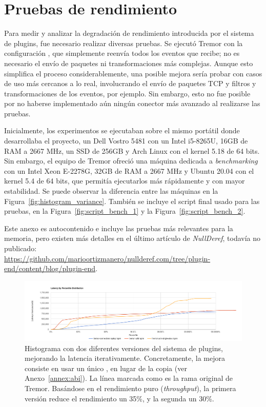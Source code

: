 \chapter{Pruebas de rendimiento}\label{annex:benchmarks}

Para medir y analizar la degradación de rendimiento introducida por el sistema
de plugins, fue necesario realizar diversas pruebas. Se ejecutó Tremor con la
configuración , que simplemente reenvía todos los eventos que
recibe; no es necesario el envío de paquetes ni transformaciones más complejas.
Aunque esto simplifica el proceso considerablemente, una posible mejora sería
probar con casos de uso más cercanos a lo real, involucrando el envío de
paquetes TCP y filtros y transformaciones de los eventos, por ejemplo. Sin
embargo, esto no fue posible por no haberse implementado aún ningún conector más
avanzado al realizarse las pruebas.

Inicialmente, los experimentos se ejecutaban sobre el mismo portátil donde
desarrollaba el proyecto, un Dell Vostro 5481 con un Intel i5-8265U, 16GB de RAM
a 2667 MHz, un SSD de 256GB y Arch Linux con el kernel 5.18 de 64 bits. Sin
embargo, el equipo de Tremor ofreció una máquina dedicada a \emph{benchmarking}
con un Intel Xeon E-2278G, 32GB de RAM a 2667 MHz y Ubuntu 20.04 con el kernel
5.4 de 64 bits, que permitía ejecutarlos más rápidamente y con mayor
estabilidad. Se puede observar la diferencia entre las máquinas en la
Figura~\ref{fig:histogram_variance}. También se incluye el script final usado
para las pruebas, en la Figura~\ref{fig:script_bench_1} y la
Figura~\ref{fig:script_bench_2}.

Este anexo es autocontenido e incluye las pruebas más relevantes para la
memoria, pero existen más detalles en el último artículo de \emph{NullDeref},
todavía no publicado:\\
\url{https://github.com/marioortizmanero/nullderef.com/tree/plugin-end/content/blog/plugin-end}.

\begin{figure}
    \centering
    \includegraphics[width=\textwidth]{./Imagenes/histogram_pdk.png}
    \caption{Histograma con dos diferentes versiones del sistema de plugins,
    mejorando la latencia iterativamente. Concretamente, la mejora consiste en
    usar un único , en lugar de la copia  (ver
    Anexo~\ref{annex:abi}). La línea marcada como
     es la rama original de Tremor. Basándose en
    el rendimiento puro (\emph{throughput}), la primera versión reduce el
    rendimiento un 35\%, y la segunda un 30\%.}%
    \label{fig:histogram_pdk}
\end{figure}

